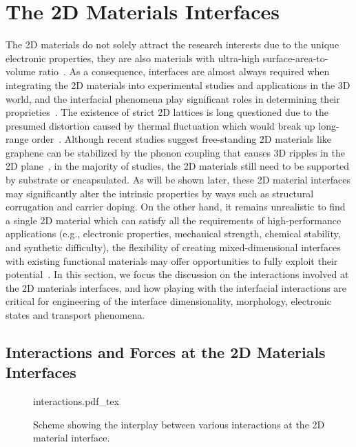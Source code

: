 \section{The 2D Materials Interfaces}
\label{sec:2d-mater-interf}
The 2D materials do not solely attract the research interests due to
the unique electronic properties, they are also materials with ultra-high surface-area-to-volume ratio~\autocite{Liu_2018_rev,Novoselov_2016_vdW}.
%
As a consequence,
interfaces are almost always required when integrating the 2D
materials into experimental studies and applications in the 3D world,
and the interfacial phenomena play significant roles in determining
their proprieties~\autocite{Liu_2018_rev}.
% 
The existence of strict 2D lattices is long questioned
due to the presumed distortion caused by thermal fluctuation which
would break up long-range
order~\autocite{Peierls_1935_unstable,landau_2009_statistical_Phys_book}.
%
Although recent studies suggest free-standing 2D materials like
graphene can be stabilized by the phonon coupling that causes 3D
ripples in the 2D
plane~\autocite{Fasolino_2007_ripple,Brivio_2011_mos2_ripple}, in the
majority of studies, the 2D materials still need to be supported by
substrate or encapsulated.  As will be shown later, these 2D material
interfaces may significantly alter the intrinsic properties by ways
such as structural corrugation and carrier doping.
%
On the other hand, it remains unrealistic to find a single 2D material
which can satisfy all the requirements of high-performance
applications (e.g., electronic properties, mechanical strength,
chemical stability, and synthetic difficulty), the flexibility of
creating mixed-dimensional interfaces with existing functional
materials may offer opportunities to fully exploit their
potential~\autocite{Jariwala_2016_mixed_vdw_het}.
%
In this section, we focus the discussion on the
interactions involved at the 2D materials interfaces,
and how playing with the
interfacial interactions are critical for engineering of the
interface dimensionality, morphology, electronic states and transport
phenomena.

\subsection{Interactions and Forces at the 2D Materials Interfaces}
\label{sec:inter-forc-at}

\begin{figure}[!htbp]
  \centering
  {interactions.pdf_tex}
  \caption{\label{fig:intro-interactions} %
    Scheme showing the interplay between various interactions at the
    2D material interface.
  }
\end{figure}

